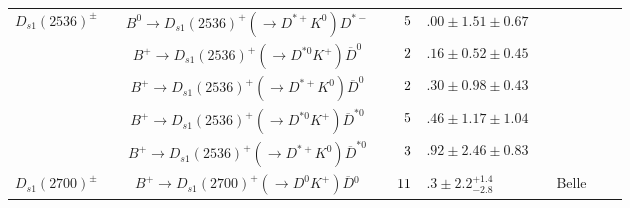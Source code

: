 \begin{adjustbox}{width=\textwidth,center}
{\begin{tabular}{cp{5pt}cp{5pt}r@{}lp{5pt}cp{5pt}c}
	\multirow{2}{*}{$D_{s1}(2536)^{\pm}$}	&&	\multirow{1}{*}{$B^{0}\to D_{s1}(2536)^{+}(\to D^{*+}K^{0})D^{*-}$}	&\cellcolor{LightGray} &$	\cellcolor{LightGray} 5$&\cellcolor{LightGray}$.00\pm1.51\pm0.67	$&\cellcolor{LightGray}&	\cellcolor{LightGray} \babar{}	&\cellcolor{LightGray}&	\cite{Aubert:2007rva}         \\ \cmidrule{3-9}
		&&	\multirow{1}{*}{$B^{+}\to D_{s1}(2536)^{+}(\to D^{*0}K^{+})\overline{D}^{0}$}	&\cellcolor{LightGray} &$	\cellcolor{LightGray} 2$&\cellcolor{LightGray}$.16\pm0.52\pm0.45	$&\cellcolor{LightGray}&	\cellcolor{LightGray} \babar{}	&\cellcolor{LightGray}&	\cite{Aubert:2007rva}         \\ \cmidrule{3-9}
		&&	\multirow{1}{*}{$B^{+}\to D_{s1}(2536)^{+}(\to D^{*+}K^{0})\overline{D}^{0}$}	&\cellcolor{LightGray} &$	\cellcolor{LightGray} 2$&\cellcolor{LightGray}$.30\pm0.98\pm0.43	$&\cellcolor{LightGray}&	\cellcolor{LightGray} \babar{}	&\cellcolor{LightGray}&	\cite{Aubert:2007rva}         \\ \cmidrule{3-9}
		&&	\multirow{1}{*}{$B^{+}\to D_{s1}(2536)^{+}(\to D^{*0}K^{+})\overline{D}^{*0}$}	&\cellcolor{LightGray} &$	\cellcolor{LightGray} 5$&\cellcolor{LightGray}$.46\pm1.17\pm1.04	$&\cellcolor{LightGray}&	\cellcolor{LightGray} \babar{}	&\cellcolor{LightGray}&	\cite{Aubert:2007rva}         \\ \cmidrule{3-9}
		&&	\multirow{1}{*}{$B^{+}\to D_{s1}(2536)^{+}(\to D^{*+}K^{0})\overline{D}^{*0}$}	&\cellcolor{LightGray} &$	\cellcolor{LightGray} 3$&\cellcolor{LightGray}$.92\pm2.46\pm0.83	$&\cellcolor{LightGray}&	\cellcolor{LightGray} \babar{}	&\cellcolor{LightGray}&	\cite{Aubert:2007rva}         \\ \midrule
	\multirow{1}{*}{$D_{s1}(2700)^{\pm}$}	&&	\multirow{1}{*}{$B^{+}\to D_{s1}(2700)^{+}(\to D^{0}K^{+})\overline{D}{}^{0}$}	&\cellcolor{LightGray} &$	\cellcolor{LightGray}  11$&\cellcolor{LightGray}$.3\pm2.2{}^{+1.4}_{-2.8}	$&\cellcolor{LightGray}&	\cellcolor{LightGray}  Belle	&\cellcolor{LightGray}&	\cite{Brodzicka:2007aa}       \\ \bottomrule
\end{tabular}
}
\end{adjustbox}
